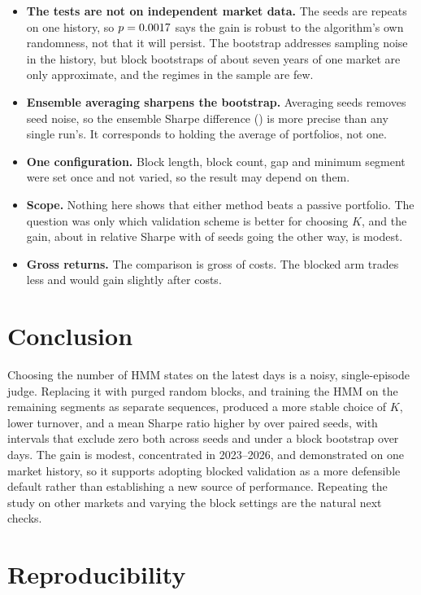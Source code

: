 \documentclass[11pt]{article}
\begin{document}
\begin{itemize}
  \item \textbf{The tests are not on independent market data.} The seeds are repeats on one history, so $p=0.0017{}$ says the gain is robust to the algorithm's own randomness, not that it will persist. The bootstrap addresses sampling noise in the history, but block bootstraps of about seven years of one market are only approximate, and the regimes in the sample are few.
  \item \textbf{Ensemble averaging sharpens the bootstrap.} Averaging \NSeeds{} seeds removes seed noise, so the ensemble Sharpe difference (\EnsDiff{}) is more precise than any single run's. It corresponds to holding the average of \NSeeds{} portfolios, not one.
  \item \textbf{One configuration.} Block length, block count, gap and minimum segment were set once and not varied, so the result may depend on them.
  \item \textbf{Scope.} Nothing here shows that either method beats a passive portfolio. The question was only which validation scheme is better for choosing $K$, and the gain, about \RelGain{} in relative Sharpe with \SeedsWorse{} of \NSeeds{} seeds going the other way, is modest.
  \item \textbf{Gross returns.} The comparison is gross of costs. The blocked arm trades less and would gain slightly after costs.
\end{itemize}

\section{Conclusion}

Choosing the number of HMM states on the latest \ValidationDays{} days is a noisy, single-episode judge. Replacing it with purged random blocks, and training the HMM on the remaining segments as separate sequences, produced a more stable choice of $K$, lower turnover, and a mean Sharpe ratio higher by \DSharpeMean{} over \NSeeds{} paired seeds, with intervals that exclude zero both across seeds and under a block bootstrap over days. The gain is modest, concentrated in 2023--2026, and demonstrated on one market history, so it supports adopting blocked validation as a more defensible default rather than establishing a new source of performance. Repeating the study on other markets and varying the block settings are the natural next checks.

\section*{Reproducibility}
\end{document}
